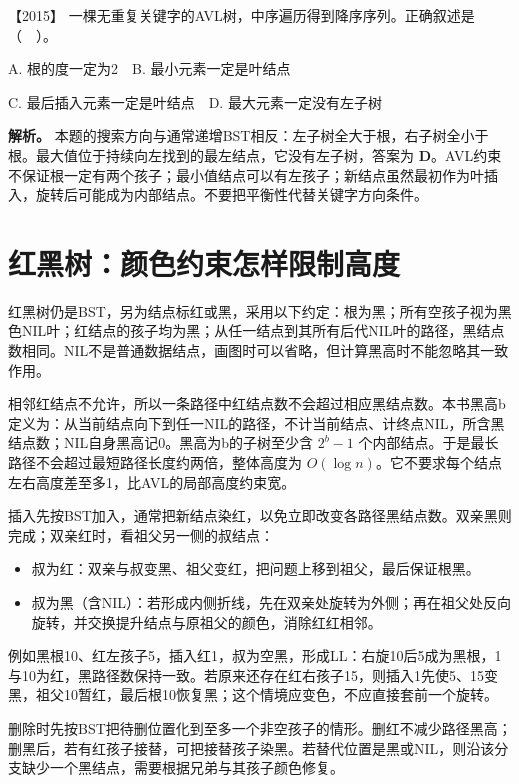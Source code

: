 \noindent{}【2015】 一棵无重复关键字的AVL树，中序遍历得到降序序列。正确叙述是（　）。

A. 根的度一定为2　B. 最小元素一定是叶结点

C. 最后插入元素一定是叶结点　D. 最大元素一定没有左子树


\textbf{解析。} 本题的搜索方向与通常递增BST相反：左子树全大于根，右子树全小于根。最大值位于持续向左找到的最左结点，它没有左子树，答案为 \textbf{D}。AVL约束不保证根一定有两个孩子；最小值结点可以有左孩子；新结点虽然最初作为叶插入，旋转后可能成为内部结点。不要把平衡性代替关键字方向条件。

\section{红黑树：颜色约束怎样限制高度}\label{ds-07-06}

红黑树仍是BST，另为结点标红或黑，采用以下约定：根为黑；所有空孩子视为黑色NIL叶；红结点的孩子均为黑；从任一结点到其所有后代NIL叶的路径，黑结点数相同。NIL不是普通数据结点，画图时可以省略，但计算黑高时不能忽略其一致作用。

相邻红结点不允许，所以一条路径中红结点数不会超过相应黑结点数。本书黑高b定义为：从当前结点向下到任一NIL的路径，不计当前结点、计终点NIL，所含黑结点数；NIL自身黑高记0。黑高为b的子树至少含 \(2^b-1\) 个内部结点。于是最长路径不会超过最短路径长度约两倍，整体高度为 \(O(\log n)\)。它不要求每个结点左右高度差至多1，比AVL的局部高度约束宽。

插入先按BST加入，通常把新结点染红，以免立即改变各路径黑结点数。双亲黑则完成；双亲红时，看祖父另一侧的叔结点：

\begin{itemize}
\tightlist
\item
  叔为红：双亲与叔变黑、祖父变红，把问题上移到祖父，最后保证根黑。
\item
  叔为黑（含NIL）：若形成内侧折线，先在双亲处旋转为外侧；再在祖父处反向旋转，并交换提升结点与原祖父的颜色，消除红红相邻。
\end{itemize}

例如黑根10、红左孩子5，插入红1，叔为空黑，形成LL：右旋10后5成为黑根，1与10为红，黑路径数保持一致。若原来还存在红右孩子15，则插入1先使5、15变黑，祖父10暂红，最后根10恢复黑；这个情境应变色，不应直接套前一个旋转。

删除时先按BST把待删位置化到至多一个非空孩子的情形。删红不减少路径黑高；删黑后，若有红孩子接替，可把接替孩子染黑。若替代位置是黑或NIL，则沿该分支缺少一个黑结点，需要根据兄弟与其孩子颜色修复。

